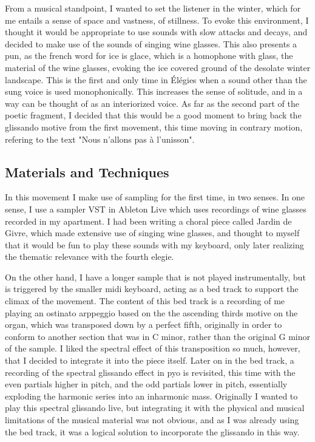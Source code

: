 \documentclass[12pt,twoside,maitrise]{dms_ks}
\theoremstyle{definition}
\begin{document}
{From a musical standpoint, I wanted to set the listener in the winter, which for me entails a sense of space and vastness, of stillness.
To evoke this environment, I thought it would be appropriate to use sounds with slow attacks and decays, and decided to make use of the sounds of singing wine glasses.
This also presents a pun, as the french word for ice is glace, which is a homophone with glass, the material of the wine glasses, evoking the ice covered ground of the desolate winter landscape.
This is the first and only time in Élégies when a sound other than the sung voice is used monophonically. This increases the sense of solitude, and in a way can be thought of as an interiorized voice.
As far as the second part of the poetic fragment, I decided that this would be a good moment to bring back the glissando motive from the first movement, this time moving in contrary motion, refering to the text "Nous n'allons pas à l'unisson".

\subsection{Materials and Techniques}

In this movement I make use of sampling for the first time, in two senses.
In one sense, I use a sampler VST in Ableton Live which uses recordings of wine glasses recorded in my apartment.
I had been writing a choral piece called Jardin de Givre, which made extensive use of singing wine glasses, and thought to myself that it would be fun to play these sounds with my keyboard, only later realizing the thematic relevance with the fourth elegie.

On the other hand, I have a longer sample that is not played instrumentally, but is triggered by the smaller midi keyboard, acting as a bed track to support the climax of the movement. The content of this bed track is a recording of me playing an ostinato arppeggio based on the the ascending thirds motive on the organ, which was transposed down by a perfect fifth, originally in order to conform to another section that was in C minor, rather than the original G minor of the sample. I liked the spectral effect of this transposition so much, however, that I decided to integrate it into the piece itself. Later on in the bed track, a recording of the spectral glissando effect in pyo is revisited, this time with the even partials higher in pitch, and the odd partials lower in pitch, essentially exploding the harmonic series into an inharmonic mass. Originally I wanted to play this spectral glissando live, but integrating it with the physical and musical limitations of the musical material was not obvious, and as I was already using the bed track, it was a logical solution to incorporate the glissando in this way.

}
\end{document}

